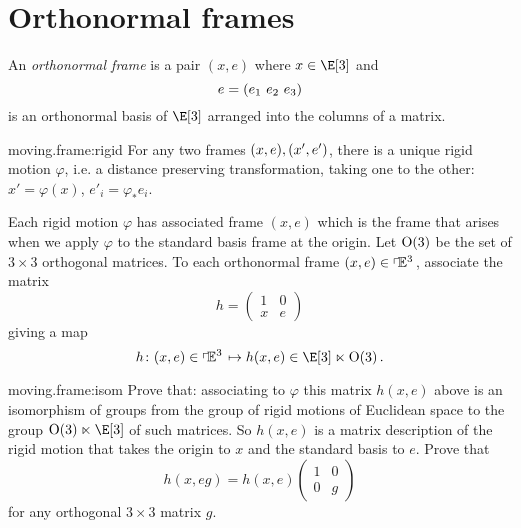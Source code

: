 \section{Orthonormal frames}
An \emph{orthonormal frame} is a pair \((x,e)\) where \(x \in \E[3]\) and 
\[
 e=\left(e_1 \ e_2 \ e_3\right)
\]
is an orthonormal basis of \(\E[3]\) arranged into the columns of a matrix.
\begin{center}
\end{center}
\begin{problem}{moving.frame:rigid}
For any two frames \((x,e), \left(x',e'\right)\), there is a unique rigid motion \(\varphi\), i.e. a distance preserving transformation, taking one to the other: \(x'=\varphi(x)\), \(e'_i=\varphi_* e_i\).
\end{problem}
Each rigid motion \(\varphi\) has associated frame \((x,e)\) which is the frame that arises when we apply \(\varphi\) to the standard basis frame at the origin.
Let \(\textrm{O}\!\left(3\right)\) be the set of \(3 \times 3\) orthogonal matrices.
To each orthonormal frame \((x,e)\in\left\ulcorner\!\mathbb{E}^{3}\right.\), associate the matrix
\[
h=
\begin{pmatrix}
1 & 0 \\
x & e
\end{pmatrix}
\]
giving a map
\[
h \colon (x,e) \in \frameBundleE{3}\mapsto h(x,e) \in \E[3] \ltimes \Orth{3}.
\]
\begin{problem}{moving.frame:isom}
Prove that: associating to \(\varphi\) this matrix \(h(x,e)\) above is an isomorphism of groups from the group of rigid motions of Euclidean space to the group \(\Orth{3} \ltimes \E[3]\) of such matrices.
So \(h(x,e)\) is a matrix description of the rigid motion that takes the origin to \(x\) and the standard basis to \(e\).
Prove that
\[
h(x,eg)=h(x,e)
\begin{pmatrix}
1 & 0 \\
0 & g
\end{pmatrix}
\]
for any orthogonal \(3 \times 3\) matrix \(g\).
\end{problem}

